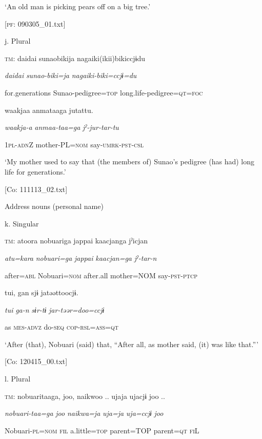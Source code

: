       ‘An old man is picking pears off on a big tree.’

      [\textsc{pf}: 090305\_01.txt]

  j.  Plural

    \textsc{tm}:  daidai  sunaobikija  nagaiki(ikii)bikiccjɨdu

      \textit{daidai}  \textit{sunao-biki=ja}  \textit{nagaiki-biki=ccjɨ=du}

      for.generations  Sunao-pedigree=\textsc{top}  long.life-pedigree=\textsc{qt}=\textsc{foc}

      waakjaa  anmataaga  jutattu.

      \textit{waakja-a}  \textit{anmaa-taa=ga}  \textit{jˀ-jur-tar-tu}

      1\textsc{pl}-\textsc{adn}Z  mother-PL=\textsc{nom}  say-\textsc{umrk}-\textsc{pst}-\textsc{csl}

      ‘My mother used to say that (the members of) Sunao’s pedigree (has had) long life for generations.’

      [Co: 111113\_02.txt]

  Address nouns (personal name)

  k.  Singular

    \textsc{tm}:  atoora  nobuariga  jappai  {\textbar}kaacjan{\textbar}ga  jˀicjan

      \textit{atu=kara}  \textit{nobuari=ga}  \textit{jappai}  \textit{kaacjan=ga}  \textit{jˀ-tar-n}

      after=\textsc{abl}  Nobuari=\textsc{nom}  after.all  mother=NOM  say-\textsc{pst}-\textsc{ptcp}

      tui,  gan  sjɨ  jatəəttoocjɨ.

      \textit{tui}  \textit{ga-n}  \textit{sɨr-tɨ}  \textit{jar-təər=doo=ccjɨ}

      as  \textsc{mes}-\textsc{advz}  do-\textsc{seq}  \textsc{cop}-\textsc{rsl}=\textsc{ass}=\textsc{qt}

      ‘After (that), Nobuari (said) that, “After all, as mother said, (it) was like that.”’

      [Co: 120415\_00.txt]

  l.  Plural

    \textsc{tm}:  nobuaritaaga,  joo,  naikwoo ..  ujaja  ujacjɨ  joo ..

      \textit{nobuari-taa=ga}  \textit{joo}  \textit{naikwa=ja}  \textit{uja=ja}  \textit{uja=ccjɨ}  \textit{joo}

      Nobuari-\textsc{pl}=\textsc{nom}  \textsc{fil}  a.little=\textsc{top}  parent=TOP  parent=\textsc{qt}  \textsc{fi}L

